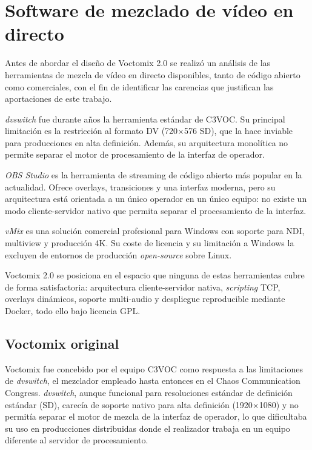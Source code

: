 \section{Software de mezclado de vídeo en directo}

Antes de abordar el diseño de Voctomix 2.0 se realizó un análisis de las herramientas
de mezcla de vídeo en directo disponibles, tanto de código abierto como comerciales,
con el fin de identificar las carencias que justifican las aportaciones de este trabajo.

\textit{dvswitch} fue durante años la herramienta estándar de C3VOC. Su principal
limitación es la restricción al formato DV (720×576 SD), que la hace inviable para
producciones en alta definición. Además, su arquitectura monolítica no permite separar
el motor de procesamiento de la interfaz de operador.

\textit{OBS Studio} es la herramienta de streaming de código abierto más popular en
la actualidad. Ofrece overlays, transiciones y una interfaz moderna, pero su
arquitectura está orientada a un único operador en un único equipo: no existe un modo
cliente-servidor nativo que permita separar el procesamiento de la interfaz.

\textit{vMix} es una solución comercial profesional para Windows con soporte para NDI,
multiview y producción 4K. Su coste de licencia y su limitación a Windows la excluyen
de entornos de producción \textit{open-source} sobre Linux.

Voctomix 2.0 se posiciona en el espacio que ninguna de estas herramientas cubre de
forma satisfactoria: arquitectura cliente-servidor nativa, \textit{scripting} TCP,
overlays dinámicos, soporte multi-audio y despliegue reproducible mediante Docker,
todo ello bajo licencia GPL.

\subsection{Voctomix original}

Voctomix fue concebido por el equipo C3VOC como respuesta a las limitaciones de
\textit{dvswitch}, el mezclador empleado hasta entonces en el Chaos Communication Congress.
\textit{dvswitch}, aunque funcional para resoluciones estándar de definición estándar (SD),
carecía de soporte nativo para alta definición (1920×1080) y no permitía separar el motor
de mezcla de la interfaz de operador, lo que dificultaba su uso en producciones distribuidas
donde el realizador trabaja en un equipo diferente al servidor de procesamiento.

